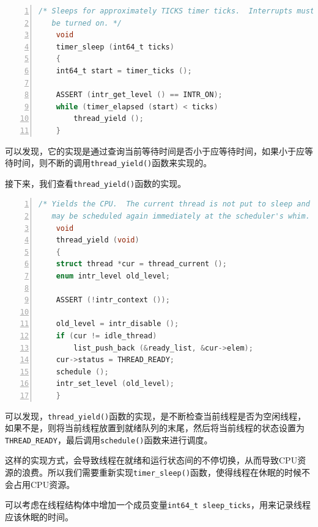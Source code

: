 \documentclass{article}
\begin{document}
\begin{lstlisting}[xleftmargin = 4em,xrightmargin = 4em, aboveskip = 1em, numbers = left, language = C,title=原本的\texttt{timer\_sleep()}函数]
    /* Sleeps for approximately TICKS timer ticks.  Interrupts must
   be turned on. */
    void
    timer_sleep (int64_t ticks) 
    {
    int64_t start = timer_ticks ();

    ASSERT (intr_get_level () == INTR_ON);
    while (timer_elapsed (start) < ticks) 
        thread_yield ();
    }
\end{lstlisting}

可以发现，它的实现是通过查询当前等待时间是否小于应等待时间，如果小于应等待时间，则不断的调用\texttt{thread\_yield()}函数来实现的。

接下来，我们查看\texttt{thread\_yield()}函数的实现。

\begin{lstlisting}[xleftmargin = 4em,xrightmargin = 4em, aboveskip = 1em, numbers = left, language = C,title=原本的\texttt{thread\_yield()}函数]
    /* Yields the CPU.  The current thread is not put to sleep and
   may be scheduled again immediately at the scheduler's whim. */
    void
    thread_yield (void) 
    {
    struct thread *cur = thread_current ();
    enum intr_level old_level;

    ASSERT (!intr_context ());

    old_level = intr_disable ();
    if (cur != idle_thread) 
        list_push_back (&ready_list, &cur->elem);
    cur->status = THREAD_READY;
    schedule ();
    intr_set_level (old_level);
    }
\end{lstlisting}

可以发现，\texttt{thread\_yield()}函数的实现，是不断检查当前线程是否为空闲线程，如果不是，则将当前线程放置到就绪队列的末尾，然后将当前线程的状态设置为\texttt{THREAD\_READY}，最后调用\texttt{schedule()}函数来进行调度。

这样的实现方式，会导致线程在就绪和运行状态间的不停切换，从而导致CPU资源的浪费。所以我们需要重新实现\texttt{timer\_sleep()}函数，使得线程在休眠的时候不会占用CPU资源。

可以考虑在线程结构体中增加一个成员变量\texttt{int64\_t sleep\_ticks}，用来记录线程应该休眠的时间。
\end{document}

